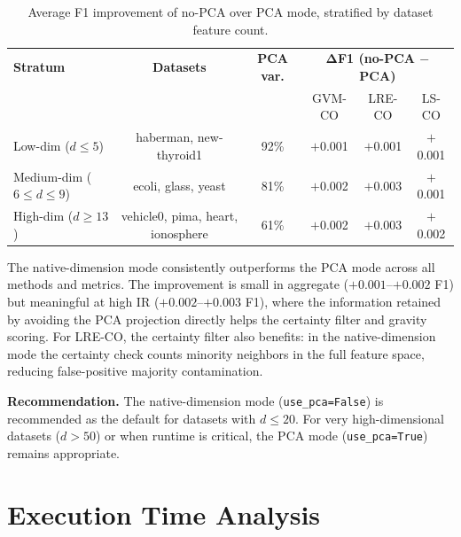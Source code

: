 \begin{table}[H]
\centering
\caption{Average F1 improvement of no-PCA over PCA mode, stratified by dataset feature count.}
\label{tab:abl:pca:strat}
\begin{tabular}{lccccc}
\toprule
\textbf{Stratum} & \textbf{Datasets} & \textbf{PCA var.} & \multicolumn{3}{c}{$\boldsymbol{\Delta}$\textbf{F1 (no-PCA $-$ PCA)}} \\
 & & & GVM-CO & LRE-CO & LS-CO \\
\midrule
Low-dim ($d \leq 5$)       & haberman, new-thyroid1 & 92\% & $+$0.001 & $+$0.001 & $+$0.001 \\
Medium-dim ($6 \leq d \leq 9$) & ecoli, glass, yeast & 81\% & $+$0.002 & $+$0.003 & $+$0.001 \\
High-dim ($d \geq 13$)     & vehicle0, pima, heart, ionosphere & 61\% & $+$0.002 & $+$0.003 & $+$0.002 \\
\bottomrule
\end{tabular}
\end{table}

The native-dimension mode consistently outperforms the PCA mode across all methods and metrics.
The improvement is small in aggregate ($+0.001$--$+0.002$ F1) but meaningful at high IR ($+0.002$--$+0.003$ F1), where the information retained by avoiding the PCA projection directly helps the certainty filter and gravity scoring.
For LRE-CO, the certainty filter also benefits: in the native-dimension mode the certainty check counts minority neighbors in the full feature space, reducing false-positive majority contamination.

\textbf{Recommendation.}
The native-dimension mode (\texttt{use\_pca=False}) is recommended as the default for datasets with $d \leq 20$.
For very high-dimensional datasets ($d > 50$) or when runtime is critical, the PCA mode (\texttt{use\_pca=True}) remains appropriate.


\section{Execution Time Analysis}
\label{sec:abl:time}

